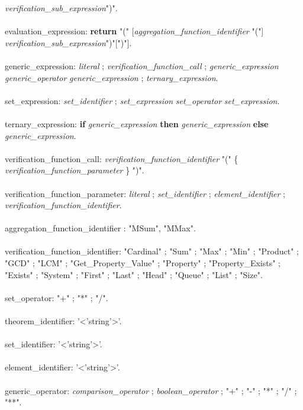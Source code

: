 {\begin{grammar}
\textit{verification\_sub\_expression}")".\\
\\
evaluation\_expression: \textbf {return} "("
[\textit{aggregation\_function\_identifier} "("]
\textit{verification\_sub\_expression}")"[")"].\\
\\
generic\_expression: \textit{literal} ; \textit
{verification\_function\_call} ;
\textit{generic\_expression} \textit{generic\_operator} 
\textit{generic\_expression} ; \textit{ternary\_expression}.\\
\\
set\_expression: \textit{set\_identifier} ; \textit{set\_expression}
\textit{set\_operator} \textit{set\_expression}.\\
\\
ternary\_expression: \textbf{if} \textit{generic\_expression} \textbf{then} \textit{generic\_expression} \textbf{else} \textit{generic\_expression}.\\
\\
verification\_function\_call:
\textit{verification\_function\_identifier} "(" \{
\textit{verification\_function\_parameter} \} ")".\\
\\
verification\_function\_parameter: \textit{literal} ;
\textit{set\_identifier} ; \textit{element\_identifier} ; \textit
{verification\_function\_identifier}.\\
\\
aggregation\_function\_identifier : "MSum", "MMax".\\
\\
verification\_function\_identifier: "Cardinal" ; "Sum" ; "Max" ;
"Min" ; "Product" ; "GCD" ; "LCM" ; "Get\_Property\_Value" ; 
"Property" ; "Property\_Exists" ; "Exists" ; "System" ; "First" ; 
"Last" ; "Head" ; "Queue" ; "List" ; "Size".\\
\\
set\_operator: "+" ; "*" ; "/".\\
\\
theorem\_identifier: '<'string'>'.\\
\\
set\_identifier: '<'string'>'.\\
\\
element\_identifier: '<'string'>'.\\
\\
generic\_operator: \textit{comparison\_operator} ;
\textit{boolean\_operator} ; "+" ; "-" ; "*" ; "/" ; "**".\\

\end{grammar}}
